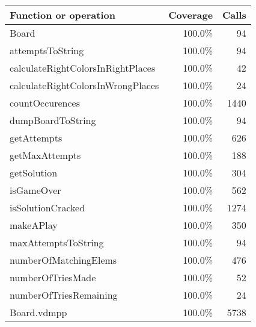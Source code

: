 \begin{longtable}{|l|r|r|}
\hline
Function or operation & Coverage & Calls \\
\hline
\hline
Board & 100.0\% & 94 \\
\hline
attemptsToString & 100.0\% & 94 \\
\hline
calculateRightColorsInRightPlaces & 100.0\% & 42 \\
\hline
calculateRightColorsInWrongPlaces & 100.0\% & 24 \\
\hline
countOccurences & 100.0\% & 1440 \\
\hline
dumpBoardToString & 100.0\% & 94 \\
\hline
getAttempts & 100.0\% & 626 \\
\hline
getMaxAttempts & 100.0\% & 188 \\
\hline
getSolution & 100.0\% & 304 \\
\hline
isGameOver & 100.0\% & 562 \\
\hline
isSolutionCracked & 100.0\% & 1274 \\
\hline
makeAPlay & 100.0\% & 350 \\
\hline
maxAttemptsToString & 100.0\% & 94 \\
\hline
numberOfMatchingElems & 100.0\% & 476 \\
\hline
numberOfTriesMade & 100.0\% & 52 \\
\hline
numberOfTriesRemaining & 100.0\% & 24 \\
\hline
\hline
Board.vdmpp & 100.0\% & 5738 \\
\hline
\end{longtable}

